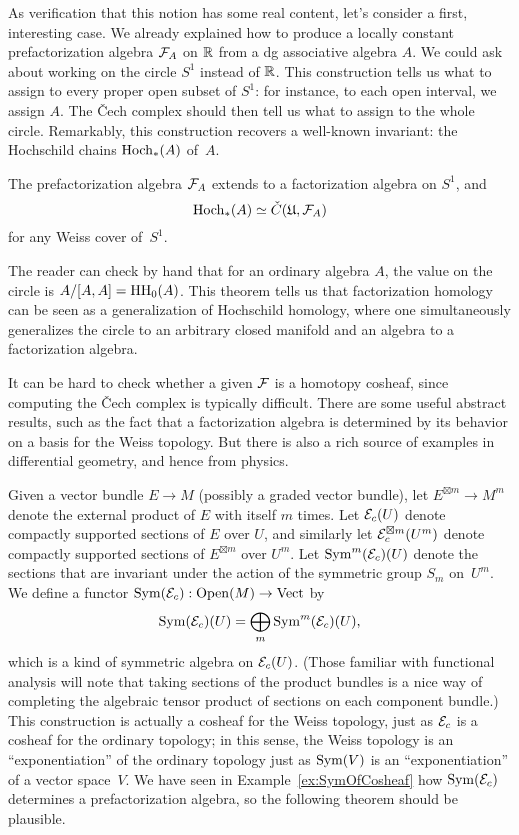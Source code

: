 \documentclass[11pt]{amsart}
\def\Open{\operatorname{Open}}
\def\Vect{\operatorname{Vect}}
\def\owen#1{{\textcolor{green!65!black}{OGG: {#1}}}}
\begin{document}
As verification that this notion has some real content, let's consider a first, interesting case.
We already explained how to produce a locally constant prefactorization algebra $\mathcal F_A$ on $\mathbb R$ from a dg associative algebra $A$.
We could ask about working on the circle $S^1$ instead of $\mathbb R$.
This construction tells us what to assign to every proper open subset of $S^1$: for instance, to each open interval, we assign $A$.
The \v{C}ech complex should then tell us what to assign to the whole circle.
Remarkably, this construction recovers a well-known invariant: the Hochschild chains ${\rm Hoch}_*(A)$ of~$A$.

\begin{thm}[\owen{citations}]
The prefactorization algebra $\mathcal F_A$ extends to a factorization algebra on $S^1$, and
\[
{\rm Hoch}_*(A) \simeq \check{C}(\mathfrak{U},\mathcal F_A)
\]
for any Weiss cover of~$S^1$.
\end{thm}

The reader can check by hand that for an ordinary algebra $A$, the value on the circle is $A/[A,A] = {\rm HH}_0(A)$.
This theorem tells us that factorization homology can be seen as a generalization of Hochschild homology,
where one simultaneously generalizes the circle to an arbitrary closed manifold and an algebra to a factorization algebra.

It can be hard to check whether a given $\mathcal F$ is a homotopy cosheaf, since computing the \v{C}ech complex is typically difficult.
There are some useful abstract results, such as the fact that a factorization algebra is determined by its behavior on a basis for the Weiss topology.
But there is also a rich source of examples in differential geometry, and hence from physics.

Given a vector bundle $E \to M$ (possibly a graded vector bundle), 
let $E^{\boxtimes m} \to M^m$ denote the external product of $E$ with itself $m$ times.
Let $\mathcal E_c(U)$ denote compactly supported sections of $E$ over $U$, 
and similarly let $\mathcal E^{\boxtimes m}_c(U^m)$ denote compactly supported sections of $E^{\boxtimes m}$ over $U^m$.
Let $\operatorname{Sym}^m(\mathcal E_c)(U)$ denote the sections that are invariant under the action of the symmetric group $S_m$ on~$U^m$.
We define a functor $\Sym(\cE_c): \Open(M) \to \Vect$ by
\[
\operatorname{Sym}(\mathcal E_c)(U) = \bigoplus_m \operatorname{Sym}^m(\mathcal E_c)(U),
\]
which is a kind of symmetric algebra on $\mathcal E_c(U)$.
(Those familiar with functional analysis will note that taking sections of the product bundles is a nice way of completing the algebraic tensor product of sections on each component bundle.)
This construction is actually a cosheaf for the Weiss topology, just as $\mathcal E_c$ is a cosheaf for the ordinary topology;
in this sense, the Weiss topology is an ``exponentiation'' of the ordinary topology just as $\operatorname{Sym}(V)$ is an ``exponentiation'' of a vector space~$V$.
We have seen in Example~\ref{ex:SymOfCosheaf} how $\operatorname{Sym}(\mathcal E_c)$ determines a prefactorization algebra,
so the following theorem should be plausible.
\end{document}
